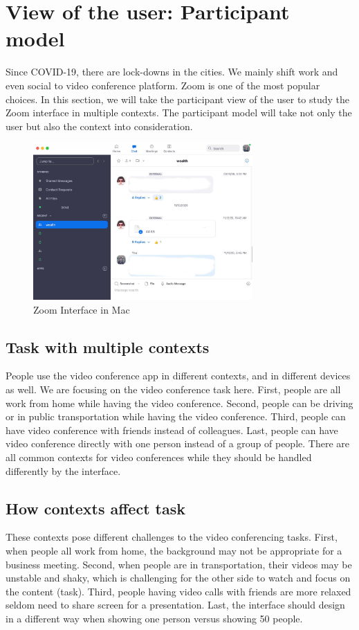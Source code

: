 \documentclass[
	letterpaper, %
]{jdf}
\begin{document}
\section{View of the user: Participant model}
Since COVID-19, there are lock-downs in the cities. We mainly shift work and even social to video conference platform. Zoom is one of the most popular choices. In this section, we will take the participant view of the user to study the Zoom interface in multiple contexts. The participant model will take not only the user but also the context into consideration.

\begin{figure}[h]
	\centering
	\includegraphics[height=6cm]{Figures/zoom.jpg}
	\caption{Zoom Interface in Mac}
	\label{fig:zoom}
\end{figure}

\subsection{Task with multiple contexts}
People use the video conference app in different contexts, and in different devices as well. We are focusing on the video conference task here. First, people are all work from home while having the video conference. Second, people can be driving or in public transportation while having the video conference. Third, people can have video conference with friends instead of colleagues. Last, people can have video conference directly with one person instead of a group of people. There are all common contexts for video conferences while they should be handled differently by the interface.

\subsection{How contexts affect task}
These contexts pose different challenges to the video conferencing tasks. First, when people all work from home, the background may not be appropriate for a business meeting. Second, when people are in transportation, their videos may be unstable and shaky, which is challenging for the other side to watch and focus on the content (task). Third, people having video calls with friends are more relaxed seldom need to share screen for a presentation. Last, the interface should design in a different way when showing one person versus showing 50 people.
\end{document}
